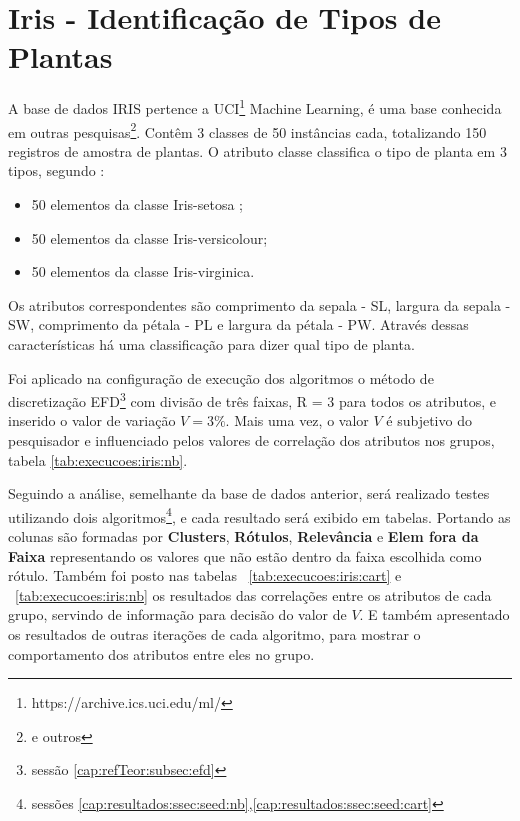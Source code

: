\section{Iris - Identificação de Tipos de Plantas}


A base de dados IRIS pertence a UCI\footnote{https://archive.ics.uci.edu/ml/} Machine Learning, é uma base conhecida em outras pesquisas\footnote{\cite{Lopes,kotsiantis2005logitboost,Filho2015} e outros}. Contêm 3 classes de 50 instâncias cada, totalizando  150 registros de amostra de plantas. O atributo classe classifica o tipo de planta em 3 tipos, segundo \cite{runkler2012} :

\begin{itemize}[noitemsep]
 \item 50 elementos da classe Iris-setosa ;
 \item 50 elementos da classe Iris-versicolour;
 \item 50 elementos da classe Iris-virginica.
\end{itemize}

Os atributos correspondentes são comprimento da sepala - SL, largura da sepala - SW, comprimento da pétala - PL e
largura da pétala - PW. Através dessas características há uma classificação para dizer qual tipo de planta.

Foi aplicado na configuração de execução dos algoritmos o método de discretização EFD\footnote{sessão \ref{cap:refTeor:subsec:efd}} com divisão de três faixas, R = 3 para todos os atributos, e inserido o valor de variação ${V=3\%}$. Mais uma vez, o valor ${V}$ é subjetivo do pesquisador e influenciado pelos valores de correlação dos atributos nos grupos, tabela \ref{tab:execucoes:iris:nb}.

Seguindo a análise, semelhante da base de dados anterior, será realizado testes utilizando dois algoritmos\footnote{sessões \ref{cap:resultados:ssec:seed:nb},\ref{cap:resultados:ssec:seed:cart}}, e cada resultado será exibido em tabelas. Portando as colunas são formadas por \textbf{Clusters}, \textbf{Rótulos}, \textbf{Relevância} e \textbf{Elem fora da Faixa} representando os valores que não estão dentro da faixa escolhida como rótulo. Também foi posto nas tabelas ~\ref{tab:execucoes:iris:cart} e ~\ref{tab:execucoes:iris:nb} os resultados das correlações entre os atributos de cada grupo, servindo de informação para decisão do valor de ${V}$. E também apresentado os resultados de outras iterações de cada algoritmo, para mostrar o comportamento dos atributos entre eles no grupo.

